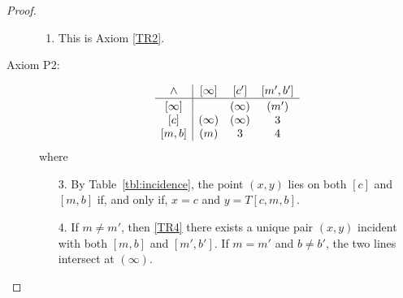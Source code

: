 \begin{proof}
\begin{description}
\begin{enumerate}
            \item This is Axiom \textsc{\ref{TR2}}.
        \end{enumerate}

        \item[\small\sc Axiom P2:]
        $$
            \begin{array}{c|ccc}
                \wedge& {[\infty]} & {[c']} & {[m',b']}\\
                \hline\rule{0pt}{10pt}
                {[\infty]} &&{(\infty)}&{(m')} \\
                {[c]} &{(\infty)} &{(\infty)}&3\\
                {[m,b]} &{(m)} &3 &4
            \end{array}
        $$
        where
        \begin{enumerate}
            \item[3.] By Table~\eqref{tbl:incidence}, the point $(x,y)$ lies on both $[c]$ and $[m,b]$ if, and only if, $x=c$ and $y=T[c,m,b]$.

            \item[4.] If $m\ne m'$, then \textsc{\ref{TR4}} there exists a unique pair $(x,y)$ incident with both $[m,b]$ and $[m',b']$. If $m=m'$ and $b\ne b'$, the two lines intersect at $(\infty)$.  


\end{enumerate}
\end{description}
\end{proof}
